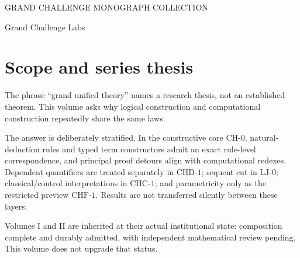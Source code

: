 \documentclass[11pt,openany]{book}
\begin{document}
\frontmatter
\begin{titlepage}
\pagecolor{GCLPale!35}\color{GCLInk}\centering
\vspace*{1.2cm}
{\small\sffamily GRAND CHALLENGE MONOGRAPH COLLECTION\par}
\vspace{1.1cm}{\Huge\bfseries TYPE THEORY\par}
\vspace{0.25cm}{\Large The Grand Unified Theory of Computation\par}
\vspace{1cm}{\color{GCLWarm}\rule{0.76\textwidth}{1.1pt}\par}
\vspace{0.25cm}{\LARGE Logic Becomes Executable\par}
\vspace{0.25cm}{\large Volume III\par}
\vfill {\large Grand Challenge Labs\par}
\end{titlepage}
\nopagecolor\color{GCLInk}

\chapter*{Scope and series thesis}
The phrase ``grand unified theory'' names a research thesis, not an established theorem. This volume asks why logical construction and computational construction repeatedly share the same laws.

The answer is deliberately stratified. In the constructive core $\mathrm{CH}\text{-}0$, natural-deduction rules and typed term constructors admit an exact rule-level correspondence, and principal proof detours align with computational redexes. Dependent quantifiers are treated separately in $\mathrm{CHD}\text{-}1$; sequent cut in $\mathrm{LJ}\text{-}0$; classical/control interpretations in $\mathrm{CHC}\text{-}1$; and parametricity only as the restricted preview $\mathrm{CHF}\text{-}1$. Results are not transferred silently between these layers.

Volumes I and II are inherited at their actual institutional state: composition complete and durably admitted, with independent mathematical review pending. This volume does not upgrade that status.
\end{document}
